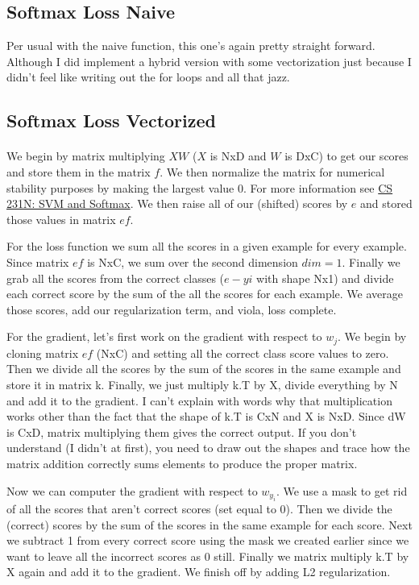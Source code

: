 \documentclass[12pt]{article}
\begin{document}
\subsection{Softmax Loss Naive}
Per usual with the naive function, this one's again pretty straight forward. Although I did 
implement a hybrid version with some vectorization just because I didn't feel like writing 
out the for loops and all that jazz.

\subsection{Softmax Loss Vectorized}
\paragraph{}
We begin by matrix multiplying $XW$ ($X$ is NxD and $W$ is DxC) to get our scores and store 
them in the matrix $f$. We then normalize the matrix for numerical stability purposes 
by making the largest value 0. For more information see \href{https://cs231n.github.io/linear-classify/#svm-vs-softmax}{CS 231N: SVM and Softmax}. 
We then raise all of our (shifted) scores by $e$ and stored those values in matrix $ef$. 

For the loss function we sum all the scores in a given example for every example. Since 
matrix $ef$ is NxC, we sum over the second dimension $dim = 1$. Finally we grab all the 
scores from the correct classes ($e-yi$ with shape Nx1) and divide each correct score by 
the sum of the all the scores for each example. We average those scores, add our 
regularization term, and viola, loss complete. 

For the gradient, let's first work on the gradient with respect to $w_j$. We begin by cloning
matrix $ef$ (NxC) and setting all the correct class score values to zero. Then we divide all 
the scores by the sum of the scores in the same example and store it in matrix k. Finally, 
we just multiply k.T by X, divide everything by N and add it to the gradient. I can't explain
with words why that multiplication works other than the fact that the shape of k.T is CxN and
X is NxD. Since dW is CxD, matrix multiplying them gives the correct output. If you don't 
understand (I didn't at first), you need to draw out the shapes and trace how the matrix addition
correctly sums elements to produce the proper matrix. 

Now we can computer the gradient with respect to $w_{y_i}$. We use a mask to get rid of all 
the scores that aren't correct scores (set equal to 0). Then we divide the (correct) scores 
by the sum of the scores in the same example for each score. Next we subtract 1 from every 
correct score using the mask we created earlier since we want to leave all the incorrect 
scores as 0 still. Finally we matrix multiply k.T by X again and add it to the gradient. We 
finish off by adding L2 regularization. 
\end{document}
